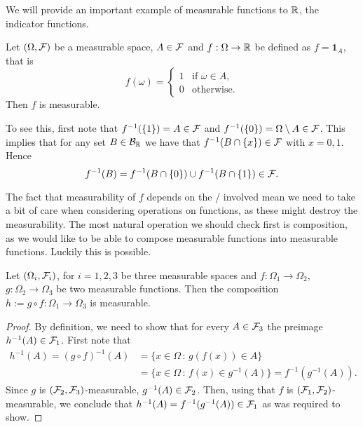 We will provide an important example of measurable functions to $\mathbb R$, the indicator functions.

\begin{example}
Let $(\Omega,\mathcal F)$ be a measurable space, $A \in \mathcal F$ and $f : \Omega \to \mathbb R$ be defined as $f = \mathbf{1}_A$, that is 
\[
	f(\omega) = \begin{cases}
		1 &\text{if } \omega \in A,\\
		0 &\text{otherwise.}
	\end{cases}
\]
Then $f$ is measurable.

To see this, first note that $f^{-1}(\{1\}) = A \in \mathcal F$ and $f^{-1}(\{0\}) = \Omega\setminus A \in \mathcal F$. This implies that for any set $B \in \mathcal B_{\mathbb R}$ we have that $f^{-1}(B \cap \{x\}) \in \mathcal F$ with $x = 0, 1$. Hence
\[
	f^{-1}(B) = f^{-1}(B \cap \{0\}) \cup f^{-1}(B \cap \{1\}) \in \mathcal F.
\]
\end{example}

The fact that measurability of $f$ depends on the \sigalgs/ involved mean we need to take a bit of care when considering operations on functions, as these might destroy the measurability. The most natural operation we should check first is composition, as we would like to be able to compose measurable functions into measurable functions. Luckily this is possible.

\begin{proposition}
Let $(\Omega_i, \mathcal F_i)$, for $i = 1,2,3$ be three measurable spaces and $f : \Omega_1 \to \Omega_2$, $g : \Omega_2 \to \Omega_3$ be two measurable functions. Then the composition $h := g \circ f : \Omega_1 \to \Omega_3$ is measurable.
\end{proposition}

\begin{proof}
By definition, we need to show that for every $A \in \mathcal F_3$ the preimage $h^{-1}(A) \in \mathcal F_1$. First note that
\begin{align*}
	h^{-1}(A) = (g\circ f)^{-1}(A) &= \{x \in \Omega \, : \, g(f(x)) \in A\} \\
	&= \{x \in \Omega \, : \, f(x) \in g^{-1}(A) \} = f^{-1}(g^{-1}(A)).
\end{align*}
Since $g$ is $(\mathcal F_2, \mathcal F_3)$-measurable, $g^{-1}(A) \in \mathcal F_2$. Then, using that $f$ is $(\mathcal F_1, \mathcal F_2)$-measurable, we conclude that $h^{-1}(A) = f^{-1}(g^{-1}(A)) \in \mathcal F_1$ as was required to show.
\end{proof}

